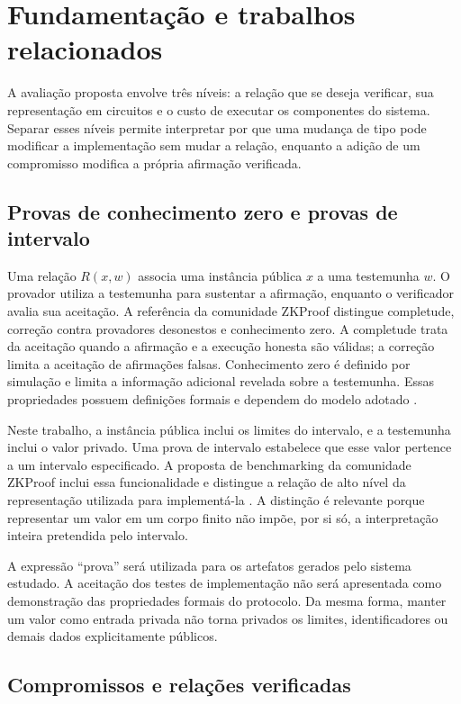 \chapter{Fundamentação e trabalhos relacionados}
\label{cap:fundamentacao}

A avaliação proposta envolve três níveis: a relação que se deseja verificar, sua representação em circuitos e o custo de executar os componentes do sistema. Separar esses níveis permite interpretar por que uma mudança de tipo pode modificar a implementação sem mudar a relação, enquanto a adição de um compromisso modifica a própria afirmação verificada.

\section{Provas de conhecimento zero e provas de intervalo}

Uma relação $R(x,w)$ associa uma instância pública $x$ a uma testemunha $w$. O provador utiliza a testemunha para sustentar a afirmação, enquanto o verificador avalia sua aceitação. A referência da comunidade ZKProof distingue completude, correção contra provadores desonestos e conhecimento zero. A completude trata da aceitação quando a afirmação e a execução honesta são válidas; a correção limita a aceitação de afirmações falsas. Conhecimento zero é definido por simulação e limita a informação adicional revelada sobre a testemunha. Essas propriedades possuem definições formais e dependem do modelo adotado \cite{zkproofref}.

Neste trabalho, a instância pública inclui os limites do intervalo, e a testemunha inclui o valor privado. Uma prova de intervalo estabelece que esse valor pertence a um intervalo especificado. A proposta de benchmarking da comunidade ZKProof inclui essa funcionalidade e distingue a relação de alto nível da representação utilizada para implementá-la \cite{zkbenchmark}. A distinção é relevante porque representar um valor em um corpo finito não impõe, por si só, a interpretação inteira pretendida pelo intervalo.

A expressão ``prova'' será utilizada para os artefatos gerados pelo sistema estudado. A aceitação dos testes de implementação não será apresentada como demonstração das propriedades formais do protocolo. Da mesma forma, manter um valor como entrada privada não torna privados os limites, identificadores ou demais dados explicitamente públicos.

\section{Compromissos e relações verificadas}

